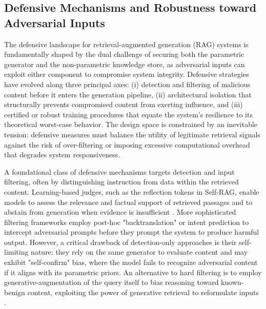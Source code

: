 \documentclass[11pt,a4paper]{article}
\begin{document}
\subsection{Defensive Mechanisms and Robustness toward Adversarial Inputs}


The defensive landscape for retrieval-augmented generation (RAG) systems is fundamentally shaped by the dual challenge of securing both the parametric generator and the non-parametric knowledge store, as adversarial inputs can exploit either component to compromise system integrity. Defensive strategies have evolved along three principal axes: (i) detection and filtering of malicious content before it enters the generation pipeline, (ii) architectural isolation that structurally prevents compromised content from exerting influence, and (iii) certified or robust training procedures that equate the system's resilience to its theoretical worst-case behavior. The design space is constrained by an inevitable tension: defensive measures must balance the utility of legitimate retrieval signals against the risk of over-filtering or imposing excessive computational overhead that degrades system responsiveness.

A foundational class of defensive mechanisms targets detection and input filtering, often by distinguishing instruction from data within the retrieved content. Learning-based judges, such as the reflection tokens in Self-RAG, enable models to assess the relevance and factual support of retrieved passages and to abstain from generation when evidence is insufficient \cite{arxiv:2310.11511v1,arxiv:2302.12813v3}. More sophisticated filtering frameworks employ post-hoc "backtranslation" or intent prediction to intercept adversarial prompts before they prompt the system to produce harmful output. However, a critical drawback of detection-only approaches is their self-limiting nature: they rely on the same generator to evaluate content and may exhibit "self-confirm" bias, where the model fails to recognize adversarial content if it aligns with its parametric priors. An alternative to hard filtering is to employ generative-augmentation of the query itself to bias reasoning toward known-benign content, exploiting the power of generative retrieval to reformulate inputs \cite{arxiv:2308.07107v3}.
\end{document}
